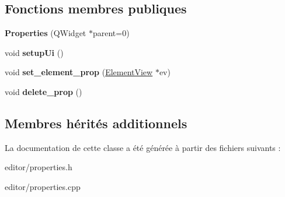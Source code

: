 \subsection*{Fonctions membres publiques}
\begin{DoxyCompactItemize}
\item 
\hypertarget{classProperties_a3b15688d359ed96e2632d2b642488a0e}{{\bfseries Properties} (Q\+Widget $\ast$parent=0)}\label{classProperties_a3b15688d359ed96e2632d2b642488a0e}

\item 
\hypertarget{classProperties_a357903294eec6fb6a410c3d54b228f74}{void {\bfseries setup\+Ui} ()}\label{classProperties_a357903294eec6fb6a410c3d54b228f74}

\item 
\hypertarget{classProperties_a035f6ed307968ff3e06e53342c0b3843}{void {\bfseries set\+\_\+element\+\_\+prop} (\hyperlink{classElementView}{Element\+View} $\ast$ev)}\label{classProperties_a035f6ed307968ff3e06e53342c0b3843}

\item 
\hypertarget{classProperties_affc1d43c4a1894c71f7970b9fb58a9db}{void {\bfseries delete\+\_\+prop} ()}\label{classProperties_affc1d43c4a1894c71f7970b9fb58a9db}

\end{DoxyCompactItemize}
\subsection*{Membres hérités additionnels}


La documentation de cette classe a été générée à partir des fichiers suivants \+:\begin{DoxyCompactItemize}
\item 
editor/properties.\+h\item 
editor/properties.\+cpp\end{DoxyCompactItemize}
